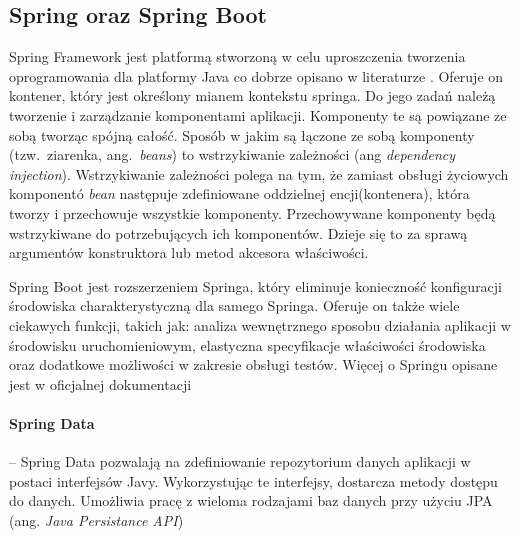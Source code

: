\subsection{Spring oraz Spring Boot}


 
Spring Framework  jest platformą stworzoną w celu uproszczenia tworzenia oprogramowania dla platformy Java co dobrze opisano w literaturze \cite{spring}. Oferuje on kontener, który jest określony mianem kontekstu springa. Do jego zadań należą tworzenie i zarządzanie komponentami aplikacji. Komponenty te są powiązane ze sobą tworząc spójną całość. Sposób w jakim są łączone ze sobą komponenty (tzw.\ ziarenka, ang.~\emph{beans}) to wstrzykiwanie zależności (ang \emph{dependency injection}). Wstrzykiwanie zależności polega na tym, że zamiast obsługi życiowych komponentó \emph{bean} następuje zdefiniowane oddzielnej encji(kontenera), która tworzy i przechowuje wszystkie komponenty. Przechowywane komponenty będą wstrzykiwane do potrzebujących ich komponentów. Dzieje się to za sprawą argumentów konstruktora lub metod akcesora właściwości. 

Spring Boot jest rozszerzeniem Springa, który eliminuje konieczność konfiguracji środowiska charakterystyczną dla samego Springa. Oferuje on także wiele ciekawych funkcji, takich jak: analiza wewnętrznego sposobu działania aplikacji w środowisku uruchomieniowym, elastyczna specyfikacje właściwości środowiska oraz dodatkowe możliwości w zakresie obsługi testów. Więcej o Springu opisane jest w oficjalnej dokumentacji \cite{springdoc}

\paragraph{Spring Data} --  Spring Data pozwalają na zdefiniowanie repozytorium danych aplikacji w postaci interfejsów Javy. Wykorzystując te interfejsy, dostarcza metody dostępu do danych. Umożliwia pracę z wieloma rodzajami baz danych przy użyciu JPA (ang. \emph{Java Persistance API})

